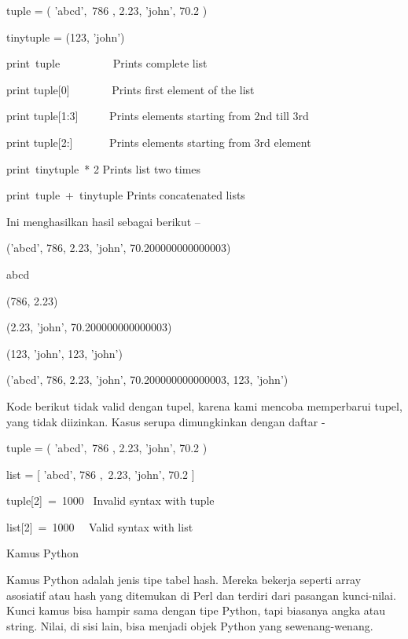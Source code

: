 \vspace{12pt}
\noindent 
tuple = ( 'abcd',~786 , 2.23, 'john', 70.2  ) \par
\noindent 
tinytuple = (123, 'john') \par
\vspace{12pt}
\noindent 
print~tuple~~~~~~~~~   Prints complete list \par
\noindent 
print tuple[0]~~~~~~~  Prints first element of the list \par
\noindent 
print tuple[1:3]~~~~~  Prints elements starting from 2nd till 3rd  \par
\noindent 
print tuple[2:]~~~~~~  Prints elements starting from 3rd element \par
\noindent 
print~tinytuple~* 2    Prints list two times \par
\noindent 
print~tuple~+~tinytuple     Prints concatenated lists \par
\vspace{12pt}
\noindent 
Ini menghasilkan hasil sebagai berikut – \par
\vspace{12pt}
\noindent 
('abcd', 786, 2.23, 'john', 70.200000000000003) \par
\noindent 
abcd \par
\noindent 
(786, 2.23) \par
\noindent 
(2.23, 'john', 70.200000000000003) \par
\noindent 
(123, 'john', 123, 'john') \par
\noindent 
('abcd', 786, 2.23, 'john', 70.200000000000003, 123, 'john') \par
\vspace{12pt}
\noindent 
Kode berikut tidak valid dengan tupel, karena kami mencoba memperbarui tupel, yang tidak diizinkan. $  $Kasus serupa dimungkinkan dengan daftar - \par
\vspace{12pt}
\noindent 
tuple = ( 'abcd',~786 , 2.23, 'john', 70.2  ) \par
\noindent 
list = [ 'abcd', 786 ,~2.23, 'john', 70.2  ] \par
\noindent 
tuple[2]~=~1000~    Invalid syntax with tuple \par
\noindent 
list[2]~=~1000~~    Valid syntax with list \par
\vspace{12pt}
\noindent 
Kamus Python \par
\vspace{12pt}
\noindent 
Kamus Python adalah jenis tipe tabel hash. $  $Mereka bekerja seperti array asosiatif atau hash yang ditemukan di Perl dan terdiri dari pasangan kunci-nilai. $  $Kunci kamus bisa hampir sama dengan tipe Python, tapi biasanya angka atau string. $  $Nilai, di sisi lain, bisa menjadi objek Python yang sewenang-wenang. \par
